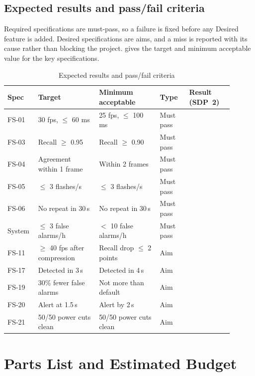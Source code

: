 \subsection{Expected results and pass/fail criteria}

Required specifications are must-pass, so a failure is fixed before any Desired feature is added. Desired specifications are aims, and a miss is reported with its cause rather than blocking the project.  gives the target and minimum acceptable value for the key specifications.

\begin{table}[htbp]
\centering
\caption{Expected results and pass/fail criteria}
\label{tab:ch5-08}
\footnotesize
\setlength{\tabcolsep}{3pt}
\renewcommand{\arraystretch}{1.15}
\begin{tabular}{|p{0.100\linewidth}|p{0.250\linewidth}|p{0.250\linewidth}|p{0.120\linewidth}|p{0.180\linewidth}|}
\hline
\textbf{Spec} & \textbf{Target} & \textbf{Minimum acceptable} & \textbf{Type} & \textbf{Result (SDP~2)} \\
\hline
FS-01 & 30 \gls{fps}, $\le$ 60 ms & 25 \gls{fps}, $\le$ 100 ms & Must pass & \\
\hline
FS-03 & Recall $\ge$ 0.95 & Recall $\ge$ 0.90 & Must pass & \\
\hline
FS-04 & Agreement within 1 frame & Within 2 frames & Must pass & \\
\hline
FS-05 & $\le$ 3 flashes/s & $\le$ 3 flashes/s & Must pass & \\
\hline
FS-06 & No repeat in 30\,s & No repeat in 30\,s & Must pass & \\
\hline
System & $\le$ 3 false alarms/h & $<$ 10 false alarms/h & Must pass & \\
\hline
FS-11 & $\ge$ 40 \gls{fps} after compression & Recall drop $\le$ 2 points & Aim & \\
\hline
FS-17 & Detected in 3\,s & Detected in 4\,s & Aim & \\
\hline
FS-19 & 30\% fewer false alarms & Not more than default & Aim & \\
\hline
FS-20 & Alert at 1.5\,s & Alert by 2\,s & Aim & \\
\hline
FS-21 & 50/50 power cuts clean & 50/50 power cuts clean & Aim & \\
\hline
\end{tabular}
\end{table}

\section{Parts List and Estimated Budget}
